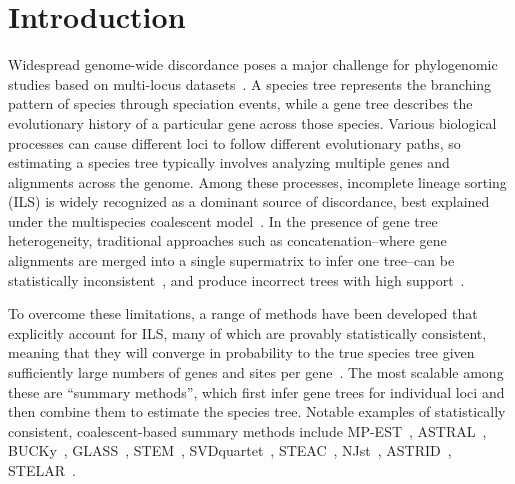 \documentclass[10pt,a4paper]{article}
\newcommand{\addr}[1]{{\color{red} #1}}
\begin{document}
\begin{abstract}



\end{abstract}
\clearpage
{}



\section{Introduction}

Widespread genome-wide discordance poses a major challenge for phylogenomic studies based on multi-locus datasets~\cite{jarvis2014,1kp}. A species tree represents the branching pattern of species through speciation events, while a gene tree describes the evolutionary history of a particular gene across those species. Various biological processes can cause different loci to follow different evolutionary paths, so estimating a species tree typically involves analyzing multiple genes and alignments across the genome. Among these processes, incomplete lineage sorting (ILS) is widely recognized as a dominant source of discordance, best explained under the multispecies coalescent model~\cite{Hud83,Nei86,Nei87,Rosenberg02}. In the presence of gene tree heterogeneity, traditional approaches such as concatenation--where gene alignments are merged into a single supermatrix to infer one tree--can be statistically inconsistent~\cite{roch2015likelihood,consensus-inconsistent}, and produce incorrect trees with high support~\cite{kubatko-degnan-2007}.

To overcome these limitations, a range of methods have been developed that explicitly account for ILS, many of which are provably statistically consistent, meaning that they will converge in probability to the true species tree given sufficiently large numbers of genes and sites per gene~\cite{heled-drummond,BEAST,best,svdquartet,mpest}. The most scalable among these are ``summary methods'', which first infer gene trees for individual loci and then combine them to estimate the species tree. Notable examples of statistically consistent, coalescent-based summary methods include MP-EST~\cite{mpest}, ASTRAL~\cite{astral}, BUCKy~\cite{larget-bioinf2010}, GLASS~\cite{glass}, STEM~\cite{stem}, SVDquartet~\cite{svdquartet},
STEAC~\cite{steac}, NJst~\cite{njst}, ASTRID~\cite{astrid}, 
STELAR~\cite{stelar}.
\end{document}
